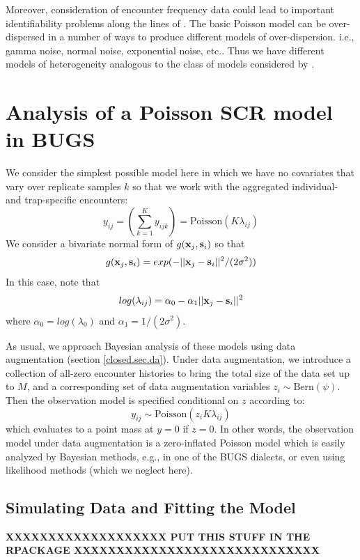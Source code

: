 Moreover, consideration of encounter frequency data could lead to
important identifiability problems along the lines of \citet{link:2003}. The
basic Poisson model can be over-dispersed in a number of ways to
produce different models of over-dispersion.  i.e., gamma noise,
normal noise, exponential noise, etc..  Thus we have different models
of heterogeneity analogous to the class of models considered by \citet{link:2003}.


\section{Analysis of a Poisson SCR model in BUGS}

We consider the simplest possible model here in which we have no
covariates that vary over replicate samples $k$ so that we work with
the aggregated individual- and trap-specific encounters:
\[
y_{ij} = (\sum_{k=1}^{K} y_{ijk}) =  \mbox{Poisson}(K  \lambda_{ij})
\]
We consider a bivariate normal form of $g({\bf x}_{j},{\bf s}_{i})$ so
that
\[
g({\bf x}_{j},{\bf s}_{i}) = exp( -||{\bf x}_{j} - {\bf
  s}_{i}||^{2} /(2\sigma^{2}))
\]
In this case, note that 
\[
log( \lambda_{ij})  =\alpha_{0} - \alpha_{1} ||{\bf x}_{j} - {\bf s}_{i}||^2
\]
where $\alpha_{0} = log(\lambda_{0})$ and $\alpha_1 = 1/(2\sigma^2)$.


As usual, we approach Bayesian analysis of these
models using data augmentation (section \ref{closed.sec.da}). 
Under data augmentation, we introduce a collection of all-zero encounter
histories to bring the total size of the data set up to $M$, and a corresponding
set of data augmentation variables $z_{i} \sim \mbox{Bern}(\psi)$. Then
the observation model is specified conditional on $z$ according to:
\[
y_{ij} \sim  \mbox{Poisson}(z_{i} K  \lambda_{ij})
\]
which evaluates to a point mass at $y=0$ if $z=0$.  In other words, the
observation model under data augmentation is a zero-inflated Poisson
model which is easily analyzed by Bayesian methods, e.g., in one of the BUGS
dialects, or even using likelihood methods (which we neglect here).



\subsection{Simulating Data and Fitting the Model}

{\bf 
XXXXXXXXXXXXXXXXXXX PUT THIS STUFF IN THE RPACKAGE XXXXXXXXXXXXXXXXXXXXXXXXXXXXX
}


